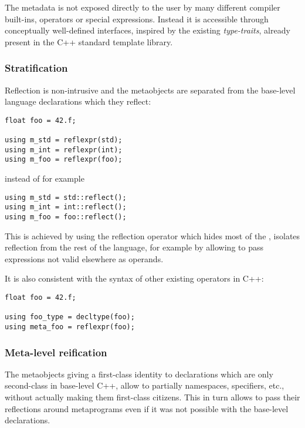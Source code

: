 The metadata is not exposed directly to the user by many different compiler
built-ins, operators or special expressions.
Instead it is accessible through conceptually well-defined interfaces,
inspired by the existing {\em type-traits}, already present in
the C++ standard template library.

\subsubsection{Stratification}
\label{design-stratification}

Reflection is non-intrusive and the metaobjects are separated
from the base-level language declarations which they reflect:

\begin{verbatim}
float foo = 42.f;

using m_std = reflexpr(std);
using m_int = reflexpr(int);
using m_foo = reflexpr(foo);
\end{verbatim}

instead of for example

\begin{verbatim}
using m_std = std::reflect();
using m_int = int::reflect();
using m_foo = foo::reflect();
\end{verbatim}

This is achieved by using the reflection operator which hides most of the
, isolates reflection from the rest of the language,
for example by allowing to pass expressions not valid elsewhere as operands.

It is also consistent with the syntax of other existing operators in C++:

\begin{verbatim}
float foo = 42.f;

using foo_type = decltype(foo);
using meta_foo = reflexpr(foo);
\end{verbatim}

\subsubsection{Meta-level reification}
\label{design-reification}

The metaobjects giving a first-class identity to declarations
which are only second-class in base-level C++,
allow to partially  namespaces, specifiers, etc., without actually
making them first-class citizens. This in turn allows to pass their reflections around
metaprograms even if it was not possible with the base-level declarations.

